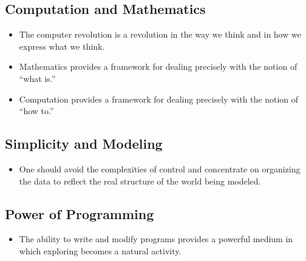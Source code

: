 \documentclass[11pt]{article}
\begin{document}
\subsection*{Computation and Mathematics}
\label{sec:org815b625}
\begin{itemize}
\item The computer revolution is a revolution in the way we think and in how we express what we think.
\item Mathematics provides a framework for dealing precisely with the notion of “what is.”
\item Computation provides a framework for dealing precisely with the notion of “how to.”
\end{itemize}
\subsection*{Simplicity and Modeling}
\label{sec:orgdc97dbd}
\begin{itemize}
\item One should avoid the complexities of control and concentrate on organizing the data to reflect the real structure of the world being modeled.
\end{itemize}
\subsection*{Power of Programming}
\label{sec:org2a5152a}
\begin{itemize}
\item The ability to write and modify programs provides a powerful medium in which exploring becomes a natural activity.
\end{itemize}
\end{document}
